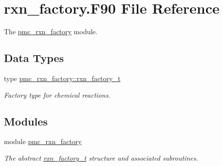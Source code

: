 \hypertarget{rxn__factory_8_f90}{}\section{rxn\+\_\+factory.\+F90 File Reference}
\label{rxn__factory_8_f90}


The \mbox{\hyperlink{namespacepmc__rxn__factory}{pmc\+\_\+rxn\+\_\+factory}} module.  


\subsection*{Data Types}
\begin{DoxyCompactItemize}
\item 
type \mbox{\hyperlink{structpmc__rxn__factory_1_1rxn__factory__t}{pmc\+\_\+rxn\+\_\+factory\+::rxn\+\_\+factory\+\_\+t}}
\begin{DoxyCompactList}\small\item\em Factory type for chemical reactions. \end{DoxyCompactList}\end{DoxyCompactItemize}
\subsection*{Modules}
\begin{DoxyCompactItemize}
\item 
module \mbox{\hyperlink{namespacepmc__rxn__factory}{pmc\+\_\+rxn\+\_\+factory}}
\begin{DoxyCompactList}\small\item\em The abstract \mbox{\hyperlink{structpmc__rxn__factory_1_1rxn__factory__t}{rxn\+\_\+factory\+\_\+t}} structure and associated subroutines. \end{DoxyCompactList}\end{DoxyCompactItemize}
